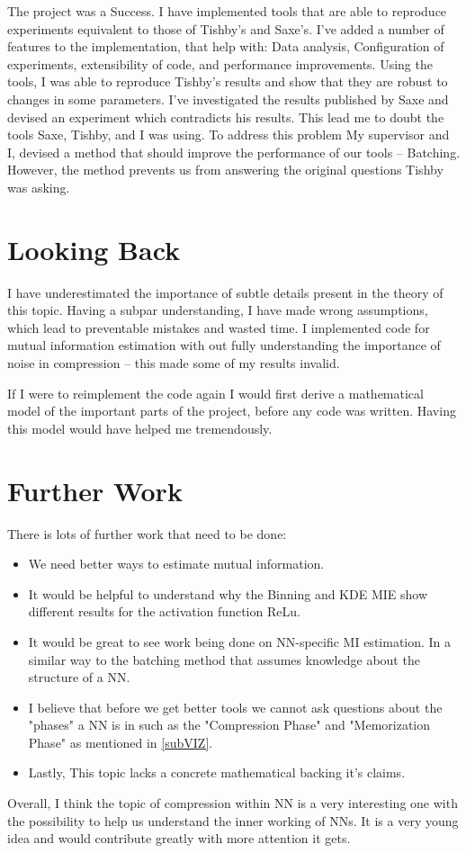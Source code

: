 \documentclass[dissertation.tex]{subfiles}
\begin{document}
The project was a Success. I have implemented tools that are able to reproduce
experiments equivalent to those of Tishby's and Saxe's. I've added a number of
features to the implementation, that help with: Data analysis, Configuration of
experiments, extensibility of code, and performance improvements. Using the
tools, I was able to reproduce Tishby's results and show that they are robust to
changes in some parameters. I've investigated the results published by Saxe and
devised an experiment which contradicts his results. This lead me to doubt the
tools Saxe, Tishby, and I was using. To address this problem My supervisor and
I, devised a method that should improve the performance of our tools --
Batching. However, the method prevents us from answering the original questions
Tishby was asking.

\section{Looking Back}
I have underestimated the importance of subtle details present in the theory of
this topic. Having a subpar understanding, I have made wrong assumptions, which
lead to preventable mistakes and wasted time. I implemented code for mutual
information estimation with out fully understanding the importance of noise in
compression -- this made some of my results invalid.

If I were to reimplement the code again I would first derive a mathematical
model of the important parts of the project, before any code was written. Having
this model would have helped me tremendously.

\section{Further Work}
There is lots of further work that need to be done:
\begin{itemize}
  \item{
      We need better ways to estimate mutual information.
    }
  \item{
      It would be helpful to understand why the Binning and KDE MIE show
      different results for the activation function ReLu.
    }
  \item{
      It would be great to see work being done on NN-specific MI estimation. In
      a similar way to the batching method that assumes knowledge about the
      structure of a NN.
    }
  \item{
      I believe that before we get better tools we cannot ask questions about
      the "phases" a NN is in such as the "Compression Phase" and "Memorization
      Phase" as mentioned in \autoref{subVIZ}.
    }
  \item{
      Lastly, This topic lacks a concrete mathematical backing it's claims. 
    }
\end{itemize}
Overall, I think the topic of compression within NN is a very interesting one with
the possibility to help us understand the inner working of NNs. It is a very
young idea and would contribute greatly with more attention it gets.
\end{document}
